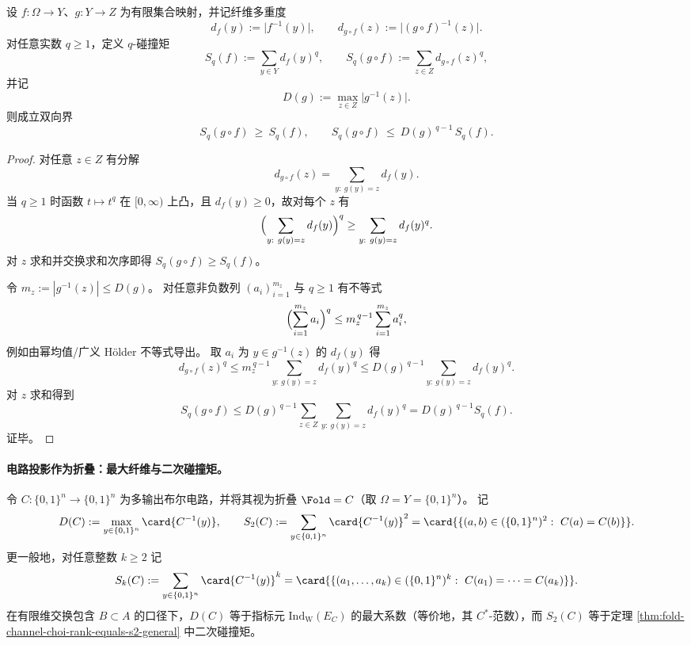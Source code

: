 \begin{proposition}\label{prop:op-algebra-coarsegraining-sq-two-sided}
设 \(f:\Omega\to Y\)、\(g:Y\to Z\) 为有限集合映射，并记纤维多重度
\[
d_f(y):=\bigl|f^{-1}(y)\bigr|,
\qquad
d_{g\circ f}(z):=\bigl|(g\circ f)^{-1}(z)\bigr|.
\]
对任意实数 \(q\ge 1\)，定义 \(q\)-碰撞矩
\[
S_q(f):=\sum_{y\in Y} d_f(y)^q,
\qquad
S_q(g\circ f):=\sum_{z\in Z} d_{g\circ f}(z)^q,
\]
并记
\[
D(g):=\max_{z\in Z}\bigl|g^{-1}(z)\bigr|.
\]
则成立双向界
\[
S_q(g\circ f)\ \ge\ S_q(f),
\qquad
S_q(g\circ f)\ \le\ D(g)^{\,q-1}\,S_q(f).
\]
\end{proposition}
\begin{proof}
对任意 \(z\in Z\) 有分解
\[
d_{g\circ f}(z)=\sum_{y:\ g(y)=z} d_f(y).
\]
当 \(q\ge 1\) 时函数 \(t\mapsto t^q\) 在 \([0,\infty)\) 上凸，且 \(d_f(y)\ge 0\)，故对每个 \(z\) 有
\[
\Bigl(\sum_{y:\ g(y)=z} d_f(y)\Bigr)^q \ge \sum_{y:\ g(y)=z} d_f(y)^q.
\]
对 \(z\) 求和并交换求和次序即得 \(S_q(g\circ f)\ge S_q(f)\)。
\par
令 \(m_z:=|g^{-1}(z)|\le D(g)\)。
对任意非负数列 \((a_i)_{i=1}^{m_z}\) 与 \(q\ge 1\) 有不等式
\[
\Bigl(\sum_{i=1}^{m_z} a_i\Bigr)^q \le m_z^{\,q-1}\sum_{i=1}^{m_z}a_i^q,
\]
例如由幂均值/广义 Hölder 不等式导出。
取 \(a_i\) 为 \(y\in g^{-1}(z)\) 的 \(d_f(y)\) 得
\[
d_{g\circ f}(z)^q
\le m_z^{\,q-1}\sum_{y:\ g(y)=z} d_f(y)^q
\le D(g)^{\,q-1}\sum_{y:\ g(y)=z} d_f(y)^q.
\]
对 \(z\) 求和得到
\[
S_q(g\circ f)\le D(g)^{\,q-1}\sum_{z\in Z}\sum_{y:\ g(y)=z} d_f(y)^q
=D(g)^{\,q-1}S_q(f).
\]
证毕。
\end{proof}

\paragraph{电路投影作为折叠：最大纤维与二次碰撞矩。}
令 \(C:\{0,1\}^n\to\{0,1\}^n\) 为多输出布尔电路，并将其视为折叠 \(\Fold=C\)（取 \(\Omega=Y=\{0,1\}^n\)）。
记
\[
D(C):=\max_{y\in\{0,1\}^n}\card{C^{-1}(y)},
\qquad
S_2(C):=\sum_{y\in\{0,1\}^n}\card{C^{-1}(y)}^2
=\card{\{(a,b)\in(\{0,1\}^n)^2:\ C(a)=C(b)\}}.
\]
更一般地，对任意整数 \(k\ge 2\) 记
\[
S_k(C):=\sum_{y\in\{0,1\}^n}\card{C^{-1}(y)}^k
=\card{\{(a_1,\dots,a_k)\in(\{0,1\}^n)^k:\ C(a_1)=\cdots=C(a_k)\}}.
\]
在有限维交换包含 \(B\subset A\) 的口径下，\(D(C)\) 等于指标元 \(\mathrm{Ind}_{\mathrm W}(E_C)\) 的最大系数（等价地，其 \(C^\ast\)-范数），而 \(S_2(C)\) 等于定理 \ref{thm:fold-channel-choi-rank-equals-s2-general} 中二次碰撞矩。

